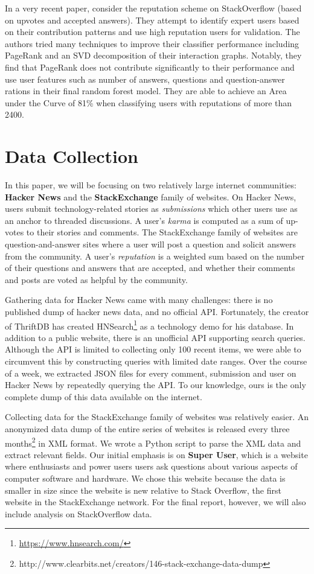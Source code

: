 \documentclass[10pt]{article}
\begin{document}
In a very recent paper, \citet{movshovitzanalysis} consider the reputation
scheme on StackOverflow (based on upvotes and accepted answers). They 
attempt to identify expert users based on their contribution
patterns and use high reputation users for validation. The authors tried many 
techniques to improve their classifier performance including PageRank and
an SVD decomposition of their interaction graphs. Notably, they find
that PageRank does not contribute significantly to their performance
and use user features such as number of answers, questions and question-answer 
rations in their final random forest model. They are
able to achieve an Area under the Curve of 81\% when classifying users
with reputations of more than 2400.

\section{Data Collection}

In this paper, we will be focusing on two relatively large internet communities:
\textbf{Hacker News} and the \textbf{StackExchange} family of
websites. On Hacker News, users submit technology-related stories as
\textit{submissions} which other users use as an anchor to threaded discussions.
A user's \textit{karma} is computed as a sum of up-votes to their stories and
comments.  The StackExchange family of websites are question-and-answer sites
where a user will post a question and solicit answers from the community. A
user's \textit{reputation} is a weighted sum based on the number of their
questions and answers that are accepted, and whether their comments and posts
are voted as helpful by the community.

Gathering data for Hacker News came with many challenges: there is no published
dump of hacker news data, and no official API. Fortunately, the creator
of ThriftDB has created HNSearch\footnote{\url{https://www.hnsearch.com/}} as a technology
demo for his database. In addition to a public website, there is an unofficial API
supporting search queries. Although the API is limited to collecting 
only 100 recent items, we were able to circumvent this by constructing queries with limited
date ranges. Over the course of a week, we extracted JSON files for every comment,
submission and user on Hacker News by repeatedly querying the API\@. To our knowledge,
ours is the only complete dump of this data available on the internet.

Collecting data for the StackExchange family of websites was relatively easier.
An anonymized data dump of the entire series of websites is released every three
months\footnote{http://www.clearbits.net/creators/146-stack-exchange-data-dump}
in XML format. We wrote a Python script to parse the XML data and extract
relevant fields. Our initial emphasis is on \textbf{Super User}, which is a website where
enthusiasts and power users users ask questions about various aspects of
computer software and hardware. We chose this website because the data
is smaller in size since the website is new relative to Stack Overflow, the first
website in the StackExchange network. For the final report, however, we will
also include analysis on StackOverflow data.
\end{document}

